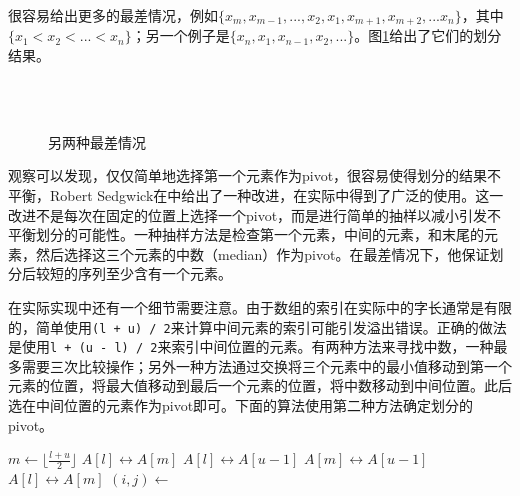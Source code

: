 \documentclass[UTF8]{article}
\begin{document}
很容易给出更多的最差情况，例如$\{ x_m, x_{m-1}, ..., x_2, x_1, x_{m+1}, x_{m+2}, ... x_n\}$，其中$\{ x_1 < x_2 < ... < x_n \}$；另一个例子是$\{x_n, x_1, x_{n-1}, x_2, ... \}$。图\ref{fig:worst-cases-2}给出了它们的划分结果。

\begin{figure}[htbp]
   \centering
    \\
    \\
   \caption{另两种最差情况}
   \label{fig:worst-cases-2}
\end{figure}

观察可以发现，仅仅简单地选择第一个元素作为pivot，很容易使得划分的结果不平衡，Robert Sedgwick在\cite{qsort-impl}中给出了一种改进，在实际中得到了广泛的使用。这一改进不是每次在固定的位置上选择一个pivot，而是进行简单的抽样以减小引发不平衡划分的可能性。一种抽样方法是检查第一个元素，中间的元素，和末尾的元素，然后选择这三个元素的中数（median）作为pivot。在最差情况下，他保证划分后较短的序列至少含有一个元素。

在实际实现中还有一个细节需要注意。由于数组的索引在实际中的字长通常是有限的，简单使用\texttt{(l + u) / 2}来计算中间元素的索引可能引发溢出错误。正确的做法是使用\texttt{l + (u - l) / 2}来索引中间位置的元素。有两种方法来寻找中数，一种最多需要三次比较操作\cite{3-way-part}；另外一种方法通过交换将三个元素中的最小值移动到第一个元素的位置，将最大值移动到最后一个元素的位置，将中数移动到中间位置。此后选在中间位置的元素作为pivot即可。下面的算法使用第二种方法确定划分的pivot。

\begin{algorithmic}[1]
    \State $m \gets \lfloor \frac{l + u}{2} \rfloor$ 
     
      \State {} $A[l] \leftrightarrow A[m]$
    \EndIf
     
      \State {} $A[l] \leftrightarrow A[u-1]$
    \EndIf
     
      \State {} $A[m] \leftrightarrow A[u-1]$
    \EndIf
    \State {} $A[l] \leftrightarrow A[m]$
    \State $(i, j) \gets $ 
    \State {}
    \State {}
  \EndIf
\EndProcedure
\end{algorithmic}
\end{document}
